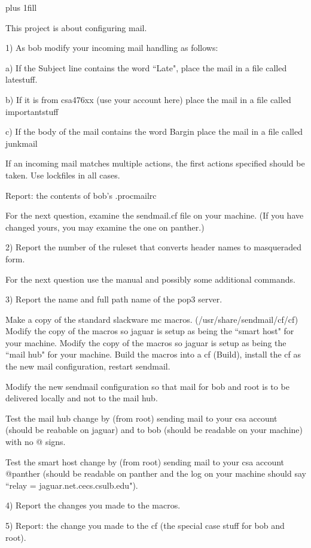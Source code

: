 
\rightskip=0pt plus 1fill

\parindent 0pt

This project is about configuring mail.

1) As {\ltt{}bob} modify your incoming mail handling as follows:

a) If the Subject line contains the word ``Late",
place the mail in a file called {\ltt{}latestuff}.

b) If it is from {\ltt{}csa476xx} (use your account here)
place the mail in a file called {\ltt{}importantstuff}

c) If the body of the mail contains the word {\ltt{}Bargin}
place the mail in a file called {\ltt{}junkmail}

If an incoming mail matches multiple actions, the first actions
specified should be taken.
Use lockfiles in all cases.

Report: the contents of bob's {\ltt{}.procmailrc}

For the next question, examine the {\ltt{}sendmail.cf}
file on your machine.
(If you have changed yours, you may examine the one on {\ltt{}panther}.)

2) Report the number of the ruleset that converts header
names to masqueraded form.

For the next question use the manual and possibly some additional commands.

3) Report the name and full path name of the pop3 server.

Make a copy of the standard slackware mc macros.
({\ltt{}/usr/share/sendmail/cf/cf})
Modify the copy of the macros so {\ltt{}jaguar} is setup as
being the ``smart host" for your machine.
Modify the copy of the macros so {\ltt{}jaguar} is setup as
being the ``mail hub" for your machine.
Build the macros into a cf ({\ltt{}Build}), install the cf
as the new mail configuration, restart sendmail.

Modify the new sendmail configuration so that 
mail for {\ltt{}bob} and {\ltt{}root} is to be delivered locally and
not to the mail hub.

Test the mail hub change by (from root) sending mail to your csa account
(should be reabable on jaguar) and to bob (should be readable on your
machine) with no {\ltt{}@} signs.

Test the smart host change by (from root) sending mail to your csa account
{\ltt{}@panther} (should be readable on panther and the log on your machine
should say ``{\ltt{}relay = jaguar.net.cecs.csulb.edu}").

4) Report the changes you made to the macros.

5) Report: the change you made to the {\ltt{}cf} (the special
case stuff for {\ltt{}bob} and {\ltt{}root}).

\bye
